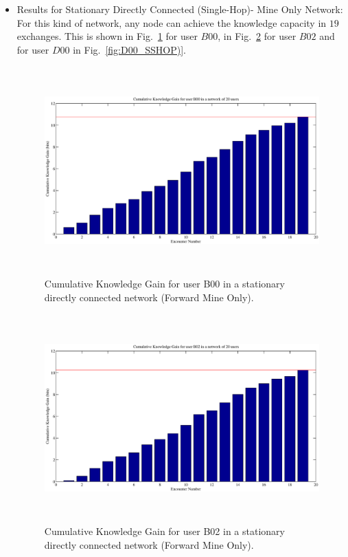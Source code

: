 \documentclass[11pt]{article}
\begin{document}
\begin{itemize}
\item Results for Stationary Directly Connected (Single-Hop)- Mine Only Network:
For this kind of network, any node can achieve the knowledge capacity in $19$ exchanges. This is shown in Fig.~\ref{fig:B00_SSHOP)} for user $B00$, in Fig.~\ref{fig:B02_SSHOP)} for user $B02$ and for user $D00$ in Fig.~\ref{fig:D00_SSHOP)}.

\begin{figure}[!tp]
\centering
    \includegraphics[width=15cm ,height=8cm]{figures_eps/B00_SSHOP}
    \caption{Cumulative Knowledge Gain for user B00 in a stationary directly connected network (Forward Mine Only).}\label{fig:B00_SSHOP)}
    \end{figure}
    \begin{figure}[!tp]
\centering
    \includegraphics[width=15cm ,height=8cm]{figures_eps/B02_SSHOP}
    \caption{Cumulative Knowledge Gain for user B02 in a stationary directly connected network (Forward Mine Only).}\label{fig:B02_SSHOP)}
    \end{figure}

\end{itemize}
\end{document}
